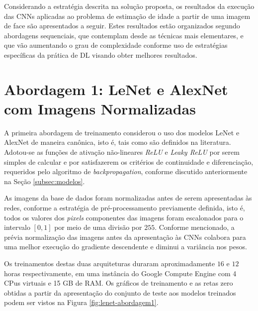 
Considerando a estratégia descrita na solução proposta, os resultados da execução das CNNs aplicadas ao problema de estimação de idade a partir de uma imagem de face são apresentados a seguir. Estes resultados estão organizados segundo abordagens sequenciais, que contemplam desde as técnicas mais elementares, e que vão aumentando o grau de complexidade conforme uso de estratégias específicas da prática de DL visando obter melhores resultados.

\section{Abordagem 1: LeNet e AlexNet com Imagens Normalizadas}%

	A primeira abordagem de treinamento considerou o uso dos modelos LeNet e AlexNet de maneira canônica, isto é, tais como são definidos na literatura. Adotou-se as funções de ativação não-lineares \emph{ReLU} e \emph{Leaky ReLU} por serem simples de calcular e por satisfazerem os critérios de continuidade e diferenciação, requeridos pelo algoritmo de \emph{backpropagation}, conforme discutido anteriormente na Seção \ref{subsec:modelos}.

	As imagens da base de dados foram normalizadas antes de serem apresentadas às redes, conforme a estratégia de pré-processamento previamente definida, isto é, todos os valores dos \emph{pixels} componentes das imagens foram escalonados para o intervalo $[0,1]$ por meio de uma divisão por $255$. Conforme mencionado, a prévia normalização das imagens antes da apresentação às CNNs colabora para uma melhor execução do gradiente descendente e diminui a variância nos pesos.

	Os treinamentos destas duas arquiteturas duraram aproximadamente $16$ e $12$ horas respectivamente, em uma instância do Google Compute Engine com 4 CPus virtuais e 15 GB de RAM. Os gráficos de treinamento e as retas zero obtidas a partir da apresentação do conjunto de teste aos modelos treinados podem ser vistos na Figura \ref{fig:lenet-abordagem1}.

